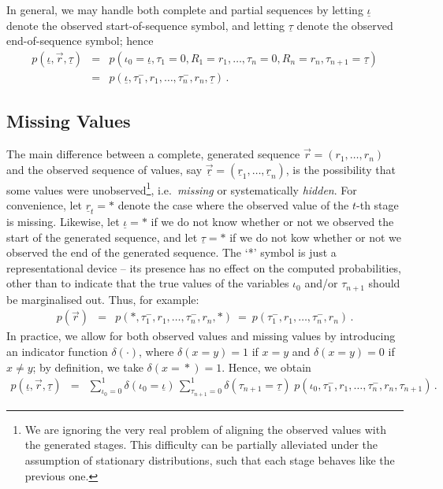 \documentclass[a4paper]{article}
\newcommand{\ui}{\underline{\iota}}
\newcommand{\ut}{\underline{\tau}}
\newcommand{\ur}{\underline{r}}
\begin{document}
In general, we may handle both complete and partial sequences by letting $\ui$ denote the observed start-of-sequence symbol, and
letting $\ut$ denote the observed end-of-sequence symbol; hence
\begin{eqnarray}
p(\ui,\vec{r},\ut)
& = & p(\iota_0\!=\!\ui,\tau_1\!=\!0,R_1\!=\!r_1,\ldots,\tau_n\!=\!0,R_n\!=\!r_n,\tau_{n+1}\!=\!\ut)
\nonumber\\
& = & p(\ui,\tau^-_1,r_1,\ldots,\tau^-_n,r_n,\ut)\,.
\label{eq:pr:gen}
\end{eqnarray}

\subsection{Missing Values}

The main difference between a complete, generated sequence $\vec{r}=(r_1,\ldots,r_n)$
and the observed sequence of values, say $\underline{\vec{r}}=(\ur_1,\ldots,\ur_n)$, 
is the possibility that some values were unobserved\footnote{We are ignoring the very real problem
of aligning the observed values with the generated stages. This difficulty can be partially alleviated under the assumption of stationary distributions, such that each stage behaves
like the previous one.}, i.e.\ {\em missing} or systematically {\em hidden}.
For convenience, let $\ur_t=*$ denote the case where the  observed value of the $t$-th stage is missing.
Likewise, let $\ui=*$ if we do not know whether or not we observed the start of the generated sequence,
and let $\ut=*$ if we do not kow whether or not we observed the end of the generated sequence.
The `*' symbol is just a representational device -- its presence has no effect on the computed probabilities, other than to indicate that the true values
of the variables $\iota_0$ and/or $\tau_{n+1}$ should be marginalised out. Thus, for example:
\begin{eqnarray}
p(\vec{r}) 
& = & p(*,\tau^-_1,r_1,\ldots,\tau^-_n,r_n,*)~=~p(\tau^-_1,r_1,\ldots,\tau^-_n,r_n)\,.
\end{eqnarray}
In practice, we allow for both observed values and missing values by introducing an indicator function $\delta(\cdot)$,
where $\delta(x\!=\!y)=1$ if $x=y$ and $\delta(x\!=\!y)=0$ if $x\ne y$;  by definition, we take $\delta(x\!=\!*)=1$.
Hence, we obtain
\begin{eqnarray}
p(\ui,\vec{r},\ut) 
& = & 
\sum_{\iota_0=0}^{1}\delta(\iota_0\!=\!\ui)
\,\sum_{\tau_{n+1}=0}^{1}\delta(\tau_{n+1}\!=\!\ut)\;
p(\iota_0,\tau^-_1,r_1,\ldots,\tau^-_n,r_n,\tau_{n+1})\,.
\end{eqnarray}
\end{document}
